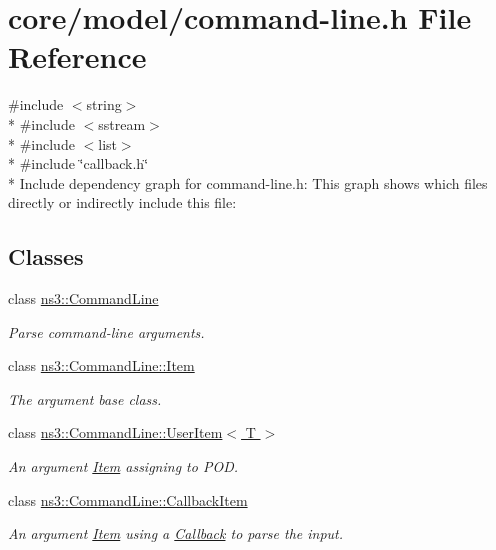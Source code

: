 \hypertarget{command-line_8h}{}\section{core/model/command-\/line.h File Reference}
\label{command-line_8h}
{\ttfamily \#include $<$string$>$}\\*
{\ttfamily \#include $<$sstream$>$}\\*
{\ttfamily \#include $<$list$>$}\\*
{\ttfamily \#include \char`\"{}callback.\+h\char`\"{}}\\*
Include dependency graph for command-\/line.h\+:
This graph shows which files directly or indirectly include this file\+:
\subsection*{Classes}
\begin{DoxyCompactItemize}
\item 
class \hyperlink{classns3_1_1CommandLine}{ns3\+::\+Command\+Line}
\begin{DoxyCompactList}\small\item\em Parse command-\/line arguments. \end{DoxyCompactList}\item 
class \hyperlink{classns3_1_1CommandLine_1_1Item}{ns3\+::\+Command\+Line\+::\+Item}
\begin{DoxyCompactList}\small\item\em The argument base class. \end{DoxyCompactList}\item 
class \hyperlink{classns3_1_1CommandLine_1_1UserItem}{ns3\+::\+Command\+Line\+::\+User\+Item$<$ T $>$}
\begin{DoxyCompactList}\small\item\em An argument \hyperlink{classns3_1_1CommandLine_1_1Item}{Item} assigning to P\+OD. \end{DoxyCompactList}\item 
class \hyperlink{classns3_1_1CommandLine_1_1CallbackItem}{ns3\+::\+Command\+Line\+::\+Callback\+Item}
\begin{DoxyCompactList}\small\item\em An argument \hyperlink{classns3_1_1CommandLine_1_1Item}{Item} using a \hyperlink{classns3_1_1Callback}{Callback} to parse the input. \end{DoxyCompactList}\end{DoxyCompactItemize}

